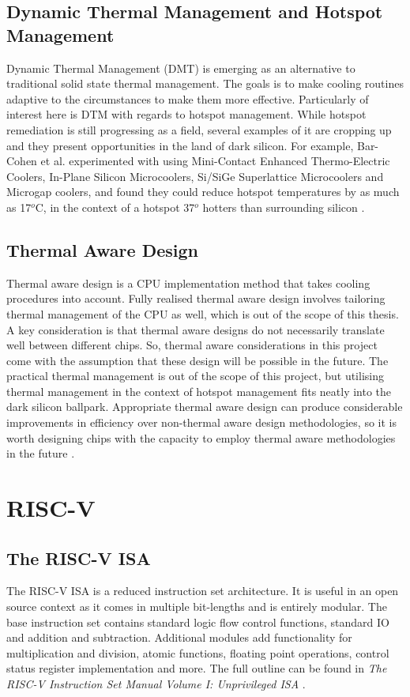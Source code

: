 		\subsection{Dynamic Thermal Management and Hotspot Management}
			Dynamic Thermal Management (DMT) is emerging as an alternative to traditional solid state thermal management. The goals is to make cooling routines adaptive to the circumstances to make them more effective. Particularly of interest here is DTM with regards to hotspot management. While hotspot remediation is still progressing as a field, several examples of it are cropping up and they present opportunities in the land of dark silicon. For example, Bar-Cohen et al. experimented with using Mini-Contact Enhanced Thermo-Electric Coolers, In-Plane Silicon Microcoolers, Si/SiGe Superlattice Microcoolers and Microgap coolers, and found they could reduce hotspot temperatures by as much as 17$^{o}$C, in the context of a hotspot 37$^{o}$ hotters than surrounding silicon \cite{Bar-CohenAvram2012Tmoo}.
			

		\subsection{Thermal Aware Design}
			Thermal aware design is a CPU implementation method that takes cooling procedures into account. Fully realised thermal aware design involves tailoring thermal management of the CPU as well, which is out of the scope of this thesis. A key consideration is that thermal aware designs do not necessarily translate well between different chips. So, thermal aware considerations in this project come with the assumption that these design will be possible in the future. The practical thermal management is out of the scope of this project, but utilising thermal management in the context of hotspot management fits neatly into the dark silicon ballpark. Appropriate thermal aware design can produce considerable improvements in efficiency over non-thermal aware design methodologies, so it is worth designing chips with the capacity to employ thermal aware methodologies in the future \cite{ThermalAwareDesign, ThermalSafePower}.
	
	\section{RISC-V}
		\subsection{The RISC-V ISA}
			The RISC-V ISA is a reduced instruction set architecture. It is useful in an open source context as it comes in multiple bit-lengths and is entirely modular. The base instruction set contains standard logic flow control functions, standard IO and addition and subtraction. Additional modules add functionality for multiplication and division, atomic functions, floating point operations, control status register implementation and more. The full outline can be found in \textit{The RISC-V Instruction Set Manual Volume I: Unprivileged ISA} \cite{riscvUnprivIsa, riscvPrivIsa}.
